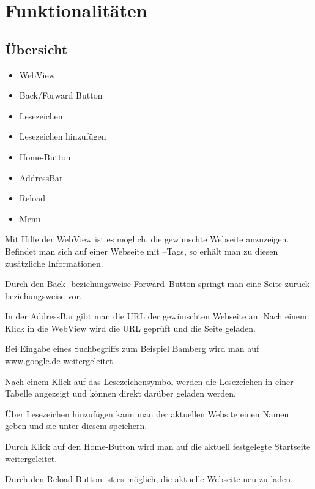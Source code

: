 \chapter{Funktionalitäten}

\section{Übersicht}

\begin{itemize}
	\item WebView
	\item Back/Forward Button
	\item Lesezeichen
	\item Lesezeichen hinzufügen
	\item Home-Button
	\item AddressBar
	\item Reload
	\item Menü
\end{itemize}

Mit Hilfe der WebView ist es möglich, die gewünschte Webseite
anzuzeigen. Befindet man sich auf einer Webseite mit \SEARCH--Tags, so
erhält man zu diesen zusätzliche Informationen.

Durch den Back- beziehungsweise Forward--Button springt man eine Seite
zurück beziehungsweise vor.

In der AddressBar gibt man die URL der gewünschten Webseite an. Nach
einem Klick in die WebView wird die URL geprüft und die Seite geladen.

Bei Eingabe eines Suchbegriffs zum Beispiel Bamberg wird man auf
\url{www.google.de} weitergeleitet.

Nach einem Klick auf das Lesezeichensymbol werden die Lesezeichen in einer
Tabelle angezeigt und können direkt darüber geladen werden.

Über Lesezeichen hinzufügen kann man der aktuellen Website einen Namen geben
und sie unter diesem speichern.

Durch Klick auf den Home-Button wird man auf die aktuell festgelegte
Startseite weitergeleitet.

Durch den Reload-Button ist es möglich, die aktuelle Webseite neu zu laden.